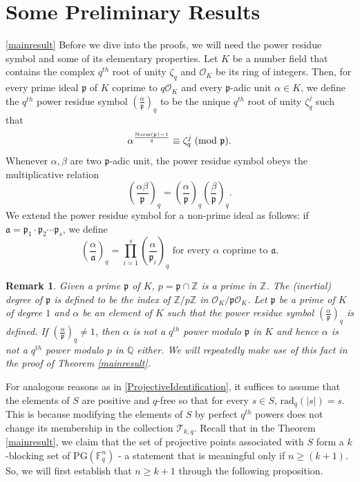 \documentclass[12pt]{amsart}
\newtheorem{remark}[theorem]{Remark}
\newcommand{\PG}{\mathrm{PG}}
\begin{document}
\section{Some Preliminary Results} \ref{mainresult} 
Before we dive into the proofs, we will need the power residue symbol and some of its elementary properties. Let $K$ be a number field that contains the complex $q^{th}$ root of unity $\zeta_{q}$ and $\mathcal{O}_{K}$ be its ring of integers. Then, for every prime ideal $\mathfrak{p}$ of $K$ coprime to $q\mathcal{O}_{K}$ and every $\mathfrak{p}$-adic unit $\alpha \in K$, we define the $q^{th}$ power residue symbol $\left(\frac{\alpha}{\mathfrak{p}}\right)_{q}$ to be the unique $q^{th}$ root of unity $\zeta_{q}^{j}$ such that 
\[\alpha^{\frac{\text{Norm}(\mathfrak{p})-1}{q}} \equiv \zeta_{q}^{j} \hspace{1mm} (\text{mod } \mathfrak{p}).\] Whenever $\alpha, \beta$ are two $\mathfrak{p}$-adic unit, the power residue symbol obeys the multiplicative relation \[  \left(\frac{\alpha\beta}{\mathfrak{p}}\right)_{q} = \left(\frac{\alpha}{\mathfrak{p}}\right)_{q} \left(\frac{\beta}{\mathfrak{p}}\right)_{q}. \] We extend the power residue symbol for a non-prime ideal as follows: if $\mathfrak{a} = \mathfrak{p}_{1} \cdot \mathfrak{p}_{2} \cdots \mathfrak{p}_{s}$, we define \[  \left(\frac{\alpha}{\mathfrak{a}}\right)_{q} = \prod_{i=1}^{s}  \left(\frac{\alpha}{\mathfrak{p}_{i}}\right)_{q}  \text{ for every } \alpha \text{ coprime to } \mathfrak{a}. \] 

\begin{remark}
  Given a prime $\mathfrak{p}$ of $K$, $p = \mathfrak{p} \cap \mathbb{Z}$ is a prime in $\mathbb{Z}$. The (inertial) degree of $\mathfrak{p}$ is defined to be the index of $\mathbb{Z}/p\mathbb{Z}$ in $\mathcal{O}_{K}/\mathfrak{p}\mathcal{O}_{K}$. Let $\mathfrak{p}$ be a prime of $K$ of degree $1$ and $\alpha$ be an element of $K$ such that the power residue symbol $\left( \frac{\alpha}{\mathfrak{p}} \right)_{q}$ is defined. If $\left( \frac{\alpha}{\mathfrak{p}} \right)_{q} \neq 1$, then $\alpha$ is not a $q^{th}$ power modulo $\mathfrak{p}$ in $K$ and hence $\alpha$ is not a $q^{th}$ power modulo $p$ in $\mathbb{Q}$ either. We will repeatedly make use of this fact in the proof of Theorem \ref{mainresult}.
\end{remark}

For analogous reasons as in \ref{ProjectiveIdentification}, it suffices to assume that the elements of $S$ are positive and $q$-free so that for every $s \in S$, $\text{rad}_{q}(\lvert s \rvert) = s$. This is because modifying the elements of $S$ by perfect $q^{th}$ powers does not change its membership in the collection $\mathcal{T}_{k,q}$. Recall that in the Theorem \ref{mainresult}, we claim that the set of projective points associated with $S$ form a $k$-blocking set of $\PG(\mathbb{F}_{q}^{n})$ - a statement that is meaningful only if $n \geq (k +1)$. So, we will first establish that $n \geq k + 1$ through the following proposition. 
\end{document}
